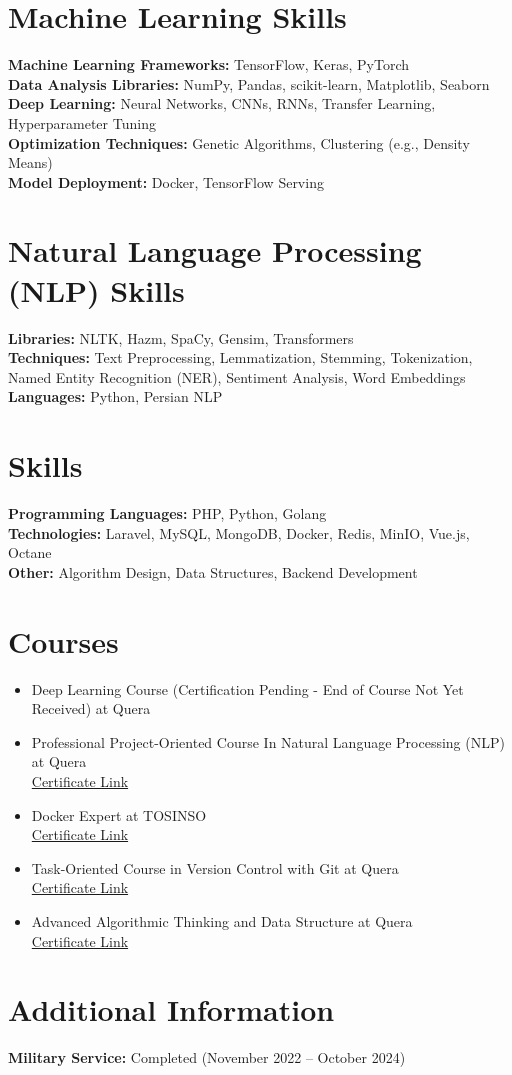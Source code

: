 \documentclass[10pt, letterpaper]{article}
\begin{document}
\section{Machine Learning Skills}
\textbf{Machine Learning Frameworks:} TensorFlow, Keras, PyTorch \\
\textbf{Data Analysis Libraries:} NumPy, Pandas, scikit-learn, Matplotlib, Seaborn \\
\textbf{Deep Learning:} Neural Networks, CNNs, RNNs, Transfer Learning, Hyperparameter Tuning \\
\textbf{Optimization Techniques:} Genetic Algorithms, Clustering (e.g., Density Means) \\
\textbf{Model Deployment:} Docker, TensorFlow Serving

\section{Natural Language Processing (NLP) Skills}
\textbf{Libraries:} NLTK, Hazm, SpaCy, Gensim, Transformers \\
\textbf{Techniques:} Text Preprocessing, Lemmatization, Stemming, Tokenization, Named Entity Recognition (NER), Sentiment Analysis, Word Embeddings \\
\textbf{Languages:} Python, Persian NLP

\section{Skills}
\textbf{Programming Languages:} PHP, Python, Golang \\
\textbf{Technologies:} Laravel, MySQL, MongoDB, Docker, Redis, MinIO, Vue.js, Octane \\
\textbf{Other:} Algorithm Design, Data Structures, Backend Development

\section{Courses}
\begin{itemize}[leftmargin=*]
    \item Deep Learning Course (Certification Pending - End of Course Not Yet Received) at Quera
    \item Professional Project-Oriented Course In Natural Language Processing (NLP) at Quera \\
    \href{https://quera.org/certificate/wfRPimzH/}{Certificate Link}
    \item Docker Expert at TOSINSO \\
    \href{https://tosinso.com/files/get/f6a4dee5-402f-4b49-9b25-bdc06fb2a464}{Certificate Link}
    \item Task-Oriented Course in Version Control with Git at Quera \\
    \href{https://quera.org/certificate/AMBOBgnQ/}{Certificate Link}
    \item Advanced Algorithmic Thinking and Data Structure at Quera \\
    \href{https://quera.org/certificate/qNltcusF/}{Certificate Link}
\end{itemize}

\section{Additional Information}
\textbf{Military Service:} Completed (November 2022 -- October 2024)
\end{document}
